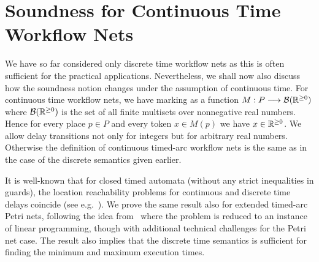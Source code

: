 \section{Soundness for Continuous Time Workflow Nets} \label{sec:cont}

We have so far considered only discrete time workflow nets as this
is often sufficient for the practical applications. Nevertheless,
we shall now also discuss how the soundness
notion changes under the assumption of continuous time. 
For continuous time workflow nets,
we have marking as a function $M : P \longrightarrow \mathcal{B}(\mathbb{R}^{\geq 0})$ 
where $\mathcal{B}(\mathbb{R}^{\geq 0})$ is the set of all finite multisets over
nonnegative real numbers. Hence for every place $p \in P$ and 
every token $x \in M(p)$ we have $x \in \mathbb{R}^{\geq 0}$. We allow delay
transitions not only for integers but for arbitrary real numbers.
Otherwise the definition of continuous timed-arc workflow nets
is the same as in the case of the discrete semantics given earlier.

It is well-known that for closed 
timed automata (without any strict inequalities in guards), 
the location reachability problems for continuous and
discrete time delays coincide (see e.g.~\cite{AMP:CONCUR:98,danny_VLiet}).
We prove the same result also for extended timed-arc Petri
nets, following the idea from~\cite{danny_VLiet} where
the problem is reduced to an instance of 
linear programming, though with additional technical challenges 
for the Petri net case.
The result also implies that
the discrete time semantics is sufficient for finding the minimum
and maximum execution times.


